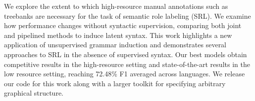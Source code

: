 We explore the extent to which high-resource manual annotations such as treebanks are necessary for the task of semantic role labeling (SRL). We examine how performance changes without syntactic supervision, comparing both joint and pipelined methods to induce latent syntax. This work highlights a new application of unsupervised grammar induction and demonstrates several approaches to SRL in the absence of supervised syntax. Our best models obtain competitive results in the high-resource setting and state-of-the-art results in the low resource setting, reaching 72.48\% F1 averaged across languages. We release our code for this work along with a larger toolkit for specifying arbitrary graphical structure.
